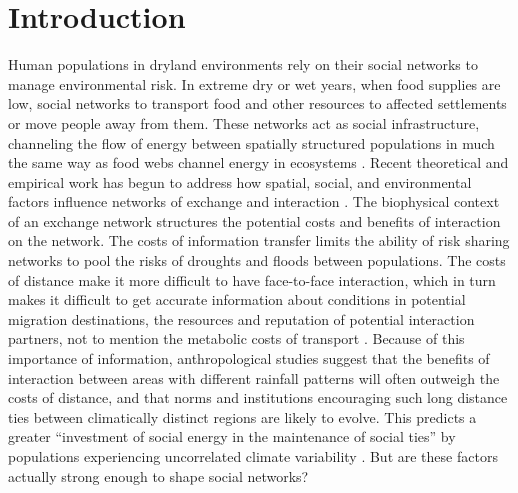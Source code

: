 \documentclass[10pt]{iopart}
\begin{document}
\section*{Introduction}
Human populations in dryland environments rely on their social networks to manage environmental risk. In extreme dry or wet years, when food supplies are low, social networks to transport food and other resources to affected settlements or move people away from them. These networks act as social infrastructure, channeling the flow of energy between spatially structured populations in much the same way as food webs channel energy in ecosystems \parencite{Crabtree2017ReconstructingStates;Crabtree2015}. Recent theoretical and empirical work has begun to address how spatial, social, and environmental factors influence networks of exchange and interaction \parencite{Nolin2010,Koster2014,Hao2015a,Schnegg2015,Freeman2014}. The biophysical context of an exchange network structures the potential costs and benefits of interaction on the network. The costs of information transfer limits the ability of risk sharing networks to pool the risks of droughts and floods between populations. The costs of distance make it more difficult to have face-to-face interaction, which in turn makes it difficult to get accurate information about conditions in potential migration destinations, the resources and reputation of potential interaction partners, not to mention the metabolic costs of transport \parencite{ostrom,Hao2015a, Anderies2011a,Drennan1984}. Because of this importance of information, anthropological studies suggest that the benefits of interaction between areas with different rainfall patterns will often outweigh the costs of distance, and that norms and institutions encouraging such long distance ties between climatically distinct regions are likely to evolve. This predicts a greater ``investment of social energy in the maintenance of social ties'' by populations experiencing uncorrelated climate variability \parencite{Rautman1993a}. But are these factors actually strong enough to shape social networks? 
\end{document}
